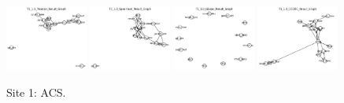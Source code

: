 \begin{figure}
    \includegraphics[width=0.24\textwidth]{chap6/figs/T1_1.0_Pearson_Result_Graph.png}
    \includegraphics[width=0.24\textwidth]{chap6/figs/T1_1.0_Spearman_Result_Graph.png}
    \includegraphics[width=0.24\textwidth]{chap6/figs/T1_1.0_Glasso_Result_Graph.png}
    \includegraphics[width=0.24\textwidth]{chap6/figs/T1_1.0_CODEC_Result_Graph.png}
    \caption{Site 1: ACS.}
    \label{fig:site1}
\end{figure}

